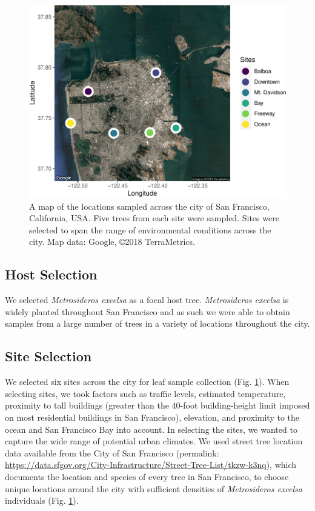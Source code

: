 \documentclass[fleqn,10pt,lineno]{wlpeerj} %
\begin{document}
\begin{figure}[p!]
\includegraphics{gibson2023_files/figure-latex/site-map-1} \caption{A map of the locations sampled across the city of San Francisco, California, USA. Five trees from each site were sampled. Sites were selected to span the range of environmental conditions across the city. Map data:  Google, ©2018 TerraMetrics.}\label{fig:site-map}
\end{figure}

\hypertarget{host-selection}{%
\subsection*{Host Selection}\label{host-selection}}

We selected \emph{Metrosideros excelsa} as a focal host tree. \emph{Metrosideros excelsa} is widely planted throughout San Francisco and as such we were able to obtain samples from a large number of trees in a variety of locations throughout the city.

\hypertarget{site-selection}{%
\subsection*{Site Selection}\label{site-selection}}

We selected six sites across the city for leaf sample collection (Fig. \ref{fig:site-map}). When selecting sites, we took factors such as traffic levels, estimated temperature, proximity to tall buildings (greater than the 40-foot building-height limit imposed on most residential buildings in San Francisco), elevation, and proximity to the ocean and San Francisco Bay into account. In selecting the sites, we wanted to capture the wide range of potential urban climates. We used street tree location data available from the City of San Francisco (permalink: \url{https://data.sfgov.org/City-Infrastructure/Street-Tree-List/tkzw-k3nq}), which documents the location and species of every tree in San Francisco, to choose unique locations around the city with sufficient densities of \emph{Metrosideros excelsa} individuals (Fig. \ref{fig:site-map}).
\end{document}
